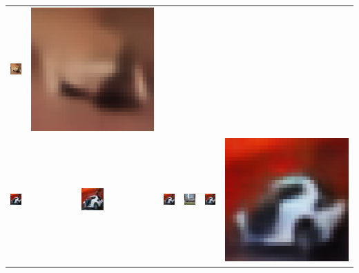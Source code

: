 \begin{table}[h!]
{\begin{tabular}{cccccc}
        \includegraphics[width=.145\textwidth]{chapter4/figures/images/cifar10/diffusion_decoder_beta_0/6.png} &
        \includegraphics[width=.145\textwidth]{chapter4/figures/images/cifar10/VAE_reconstruction/6.png} \\
        \includegraphics[width=.145\textwidth]{chapter4/figures/images/cifar10/original/7.png} &   
        \includegraphics[width=.145\textwidth]{chapter4/figures/images/cifar10/reconstruction/7.png} &
        \includegraphics[width=.145\textwidth]{chapter4/figures/images/cifar10/corrected_reconstruction/7.png} &
        \includegraphics[width=.145\textwidth]{chapter4/figures/images/cifar10/diffusion_decoder_beta_0.01/7.png} &
        \includegraphics[width=.145\textwidth]{chapter4/figures/images/cifar10/diffusion_decoder_beta_0/7.png} &
        \includegraphics[width=.145\textwidth]{chapter4/figures/images/cifar10/VAE_reconstruction/7.png} \\

\end{tabular}}
\end{table}
